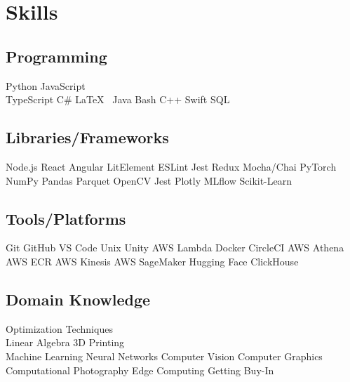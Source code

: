 \documentclass[]{plushcv}
\begin{document}
\begin{minipage}[t]{0.25\textwidth}


    \section{Skills}
    \subsection{Programming}
    \sectionsep
    Python \textbullet{} 
    JavaScript \textbullet{} \\ 
    TypeScript \textbullet{} 
    C\# \textbullet{}
    \LaTeX\ \textbullet{}
    Java \textbullet{}  
    Bash \textbullet{}
    C++ \textbullet{} 
    Swift \textbullet{}
    SQL \textbullet{}
    \sectionsep{}
    \sectionsep{}
    \subsection{Libraries/Frameworks}
    \sectionsep{}
    Node.js \textbullet{}
    React \textbullet{}
    Angular \textbullet{}
    LitElement \textbullet{}
    ESLint \textbullet{} 
    Jest \textbullet{}
    Redux \textbullet{}
    Mocha/Chai\textbullet{} 
    PyTorch \textbullet{} 
    NumPy \textbullet{} 
    Pandas \textbullet{} 
    Parquet \textbullet{} 
    OpenCV \textbullet {} 
    Jest \textbullet{} 
    Plotly \textbullet{}
    MLflow \textbullet{}
    Scikit-Learn \textbullet{}
    \sectionsep{}
    \sectionsep{}
    \subsection{Tools/Platforms}
    \sectionsep{}
    Git \textbullet{} 
    GitHub \textbullet{}
    VS Code \textbullet{}  
    Unix \textbullet{}
    Unity \textbullet{} 
    AWS Lambda \textbullet{}
    Docker \textbullet{} 
    CircleCI \textbullet{} 
    AWS Athena \textbullet{}
    AWS ECR \textbullet{}
    AWS Kinesis \textbullet{}
    AWS SageMaker \textbullet{}
    Hugging Face \textbullet{}
    ClickHouse \textbullet{}
    \sectionsep{}
    \sectionsep{}
    \subsection{Domain Knowledge}
    \sectionsep
    Optimization Techniques \textbullet{} \\
    Linear Algebra \textbullet{}
    3D Printing \textbullet{} \\
    Machine Learning \textbullet{} 
    Neural Networks \textbullet{}
    Computer Vision \textbullet{} 
    Computer Graphics \textbullet{} 
    Computational Photography \textbullet{} 
    Edge Computing \textbullet{}
    Getting Buy-In \textbullet{}
    \sectionsep


\end{minipage}
\end{document}
